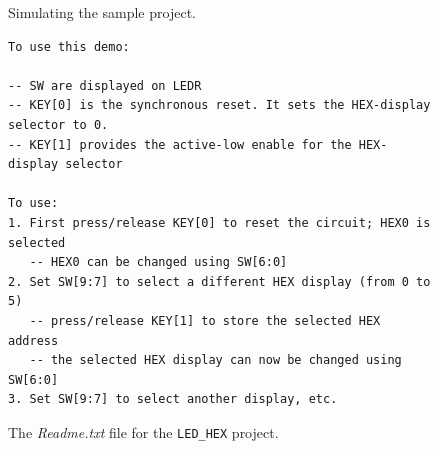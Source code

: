 \documentclass[epsfig,10pt,fullpage]{article} \addtolength{\textwidth}{1.5in}
\begin{document}
\begin{figure}[h]
	\begin{center}
        \setlength{\fboxsep}{0pt}
	\end{center}
          \caption{Simulating the sample project.}
	\label{fig:sim}
\end{figure}

\lstset{language=make,numbers=none,escapechar=|}
\begin{figure}[h]
\begin{center}
\begin{minipage}[t]{12.5 cm}
\begin{lstlisting}[name=readme]
To use this demo:

-- SW are displayed on LEDR
-- KEY[0] is the synchronous reset. It sets the HEX-display selector to 0.
-- KEY[1] provides the active-low enable for the HEX-display selector

To use:
1. First press/release KEY[0] to reset the circuit; HEX0 is selected
   -- HEX0 can be changed using SW[6:0]
2. Set SW[9:7] to select a different HEX display (from 0 to 5) 
   -- press/release KEY[1] to store the selected HEX address
   -- the selected HEX display can now be changed using SW[6:0]
3. Set SW[9:7] to select another display, etc.
\end{lstlisting}
\end{minipage}
    \caption{The {\it Readme.txt} file for the \texttt{LED\_HEX} project.}
\label{fig:readme}
\end{center}
\end{figure}
\end{document}
